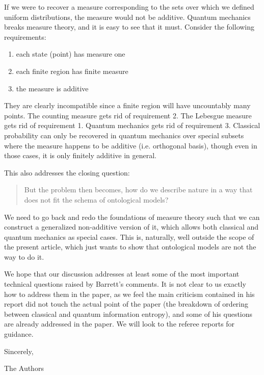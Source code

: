 \documentclass[11pt]{article}
\begin{document}
If we were to recover a measure corresponding to the sets over which we defined uniform distributions, the measure would not be additive. %
Quantum mechanics breaks measure theory, and it is easy to see that it must. Consider the following requirements:
\begin{enumerate}
	\item each state (point) has measure one
	\item each finite region has finite measure
	\item the measure is additive
\end{enumerate}
They are clearly incompatible since a finite region will have uncountably many points. The counting measure gets rid of requirement 2. The Lebesgue measure gets rid of requirement 1. Quantum mechanics gets rid of requirement 3. Classical probability can only be recovered in quantum mechanics over special subsets where the measure happens to be additive (i.e. orthogonal basis), though even in those cases, it is only finitely additive in general.

This also addresses the closing question:
\begin{quote}
But the problem then becomes,
how do we describe nature in a way that does not fit the schema of ontological
models?	
\end{quote}
We need to go back and redo the foundations of measure theory such that we can construct a generalized non-additive version of it, which allows both classical and quantum mechanics as special cases. This is, naturally, well outside the scope of the present article, which just wants to show that ontological models are not the way to do it.

We hope that our discussion addresses at least some of the most important technical questions raised by Barrett's comments. It is not clear to us exactly how to address them in the paper, as we feel the main criticism contained in his report did not touch the actual point of the paper (the breakdown of ordering between classical and quantum information entropy), and some of his questions are already addressed in the paper. We will look to the referee reports for guidance.
\vspace{5mm}

Sincerely,

The Authors
\end{document}
